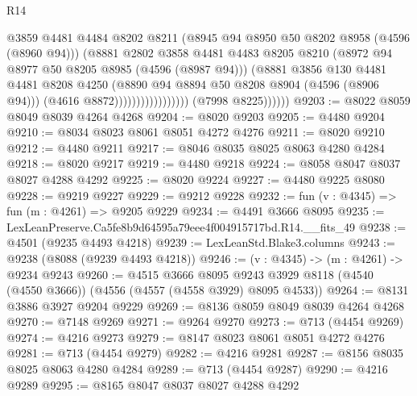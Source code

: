 \begin{lexlean}{R14}
\begin{coremodule}
                                          @3859
                                          @4481
                                          @4484
                                          @8202
                                          @8211
                                          (@8945 @94 @8950 @50 @8202 @8958 (@4596 (@8960 @94)))
                                          (@8881
                                            @2802
                                            @3858
                                            @4481
                                            @4483
                                            @8205
                                            @8210
                                            (@8972 @94 @8977 @50 @8205 @8985 (@4596 (@8987 @94)))
                                            (@8881
                                              @3856
                                              @130
                                              @4481
                                              @4481
                                              @8208
                                              @4250
                                              (@8890 @94 @8894 @50 @8208 @8904 (@4596 (@8906 @94)))
                                              (@4616 @8872)))))))))))))))))
              (@7998 @8225))))))
@9203 := @8022 @8059 @8049 @8039 @4264 @4268
@9204 := @8020 @9203
@9205 := @4480 @9204
@9210 := @8034 @8023 @8061 @8051 @4272 @4276
@9211 := @8020 @9210
@9212 := @4480 @9211
@9217 := @8046 @8035 @8025 @8063 @4280 @4284
@9218 := @8020 @9217
@9219 := @4480 @9218
@9224 := @8058 @8047 @8037 @8027 @4288 @4292
@9225 := @8020 @9224
@9227 := @4480 @9225 @8080
@9228 := @9219 @9227
@9229 := @9212 @9228
@9232 := fun (v : @4345) => fun (m : @4261) => @9205 @9229
@9234 := @4491 @3666 @8095
@9235 := LexLeanPreserve.Ca5fe8b9d64595a79eee4f004915717bd.R14.__fits_49
@9238 := @4501 (@9235 @4493 @4218)
@9239 := LexLeanStd.Blake3.columns
@9243 := @9238 (@8088 (@9239 @4493 @4218))
@9246 := (v : @4345) -> (m : @4261) -> @9234 @9243
@9260 := @4515
    @3666
    @8095
    @9243
    @3929
    @8118
    (@4540 (@4550 @3666))
    (@4556 (@4557 (@4558 @3929) @8095 @4533))
@9264 := @8131 @3886 @3927 @9204 @9229
@9269 := @8136 @8059 @8049 @8039 @4264 @4268
@9270 := @7148 @9269
@9271 := @9264 @9270
@9273 := @713 (@4454 @9269)
@9274 := @4216 @9273
@9279 := @8147 @8023 @8061 @8051 @4272 @4276
@9281 := @713 (@4454 @9279)
@9282 := @4216 @9281
@9287 := @8156 @8035 @8025 @8063 @4280 @4284
@9289 := @713 (@4454 @9287)
@9290 := @4216 @9289
@9295 := @8165 @8047 @8037 @8027 @4288 @4292

\end{coremodule}
\end{lexlean}
